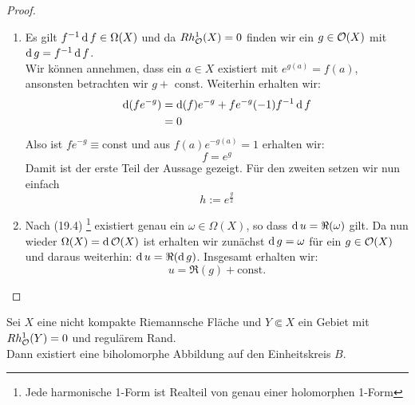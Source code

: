 \begin{proof}
  \begin{enumerate}
  \item Es gilt $f^{-1}\d[f] \in \Omega(X)$ und da $Rh^1_{\mathcal{O}}(X) = 0$
    finden wir ein $g \in \mathcal{O}(X)$ mit $\d[g] = f^{-1} \d[f]$.\\
    Wir können annehmen, dass ein $a \in X$ existiert mit $ e^{g(a)} =
    f(a)$, ansonsten betrachten wir $g +$ const. Weiterhin erhalten wir:
    \begin{align*}
      \d[(f e^{-g})] & = \d[(f)] e^{-g} + f e^{-g} (-1) f^{-1}\d[f] \\
      & = 0
    \end{align*}
    Also ist $fe^{-g} \equiv $const und aus $f(a) e^{-g(a)} = 1$
    erhalten wir:
    \[
    f = e^g
    \]
    Damit ist der erste Teil der Aussage gezeigt. Für den zweiten
    setzen wir nun einfach
    \[
    h := e^{\frac{g}{2}}
    \]
  \item Nach (19.4) \footnote{Jede harmonische 1-Form ist Realteil von genau einer holomorphen
    1-Form} existiert genau ein $\omega \in \Omega(X)$, so dass $\d[u]
    = \Re(\omega)$ gilt. Da nun wieder $\Omega(X) = \d[\hol(X)]$ ist
    erhalten wir zunächst $\d[g] = \omega$ für ein $g \in \mathcal{O}(X)$ und
    daraus weiterhin: $\d[u] = \Re(\d[g])$. Insgesamt erhalten wir:
    \[
    u = \Re(g) + \text{const.}
    \]
  \end{enumerate}
\end{proof}

\begin{thm}
  \label{thm:Gebiet-Kreis}
  Sei $X$ eine nicht kompakte Riemannsche Fläche und $Y \Subset X$ ein
  Gebiet mit $Rh^1_{\mathcal{O}}(Y) = 0$ und regulärem Rand. \\
  Dann existiert eine biholomorphe Abbildung auf den Einheitskreis $B$.
\end{thm}

